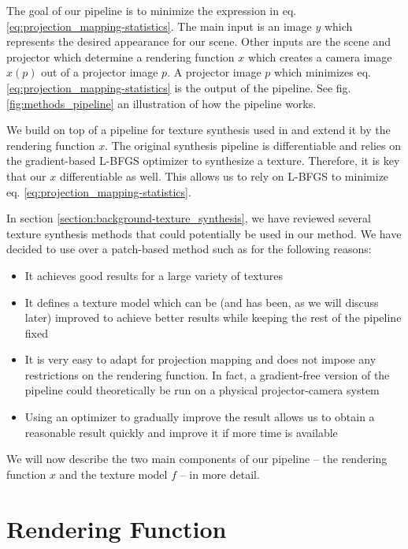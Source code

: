 The goal of our pipeline is to minimize the expression in eq. \ref{eq:projection_mapping-statistics}. The main input is an image \(y\) which represents the desired appearance for our scene. Other inputs are the scene and projector which determine a rendering function \(x\) which creates a camera image \(x(p)\) out of a projector image \(p\). A projector image \(p\) which minimizes eq. \ref{eq:projection_mapping-statistics} is the output of the pipeline. See fig. \ref{fig:methods_pipeline} an illustration of how the pipeline works.

We build on top of a pipeline for texture synthesis used in \citet{Gatys2015} and extend it by the rendering function \(x\). The original synthesis pipeline is differentiable and relies on the gradient-based L-BFGS optimizer to synthesize a texture. Therefore, it is key that our \(x\) differentiable as well. This allows us to rely on L-BFGS to minimize eq. \ref{eq:projection_mapping-statistics}.

In section \ref{section:background-texture_synthesis}, we have reviewed several texture synthesis methods that could potentially be used in our method. We have decided to use \citet{Gatys2015} over a patch-based method such as \citet{Efros2001} for the following reasons:

\begin{itemize}
    \item It achieves good results for a large variety of textures
    \item It defines a texture model which can be (and has been, as we will discuss later) improved to achieve better results while keeping the rest of the pipeline fixed
    \item It is very easy to adapt for projection mapping and does not impose any restrictions on the rendering function. In fact, a gradient-free version of the pipeline could theoretically be run on a physical projector-camera system
    \item Using an optimizer to gradually improve the result allows us to obtain a reasonable result quickly and improve it if more time is available
\end{itemize}

We will now describe the two main components of our pipeline -- the rendering function \(x\) and the texture model \(f\) -- in more detail.

\section{Rendering Function}
\label{section:methods-rendering_function}

